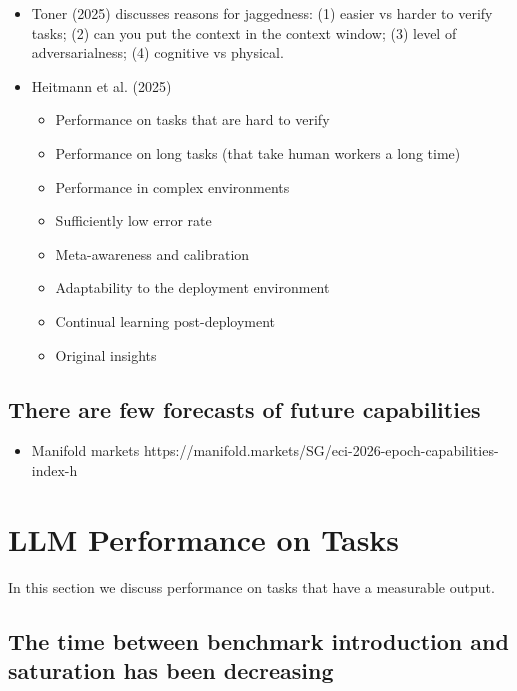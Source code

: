 \documentclass[
  letterpaper,
  DIV=11,
  numbers=noendperiod,
  oneside]{scrartcl}
\providecommand{\tightlist}{%
  \setlength{\itemsep}{0pt}\setlength{\parskip}{0pt}}
\begin{document}
\begin{itemize}
\tightlist
\item
  Toner (2025) discusses reasons for jaggedness: (1) easier vs harder to
  verify tasks; (2) can you put the context in the context window; (3)
  level of adversarialness; (4) cognitive vs physical.
\item
  Heitmann et al. (2025)

  \begin{itemize}
  \tightlist
  \item
    Performance on tasks that are hard to verify
  \item
    Performance on long tasks (that take human workers a long time)
  \item
    Performance in complex environments
  \item
    Sufficiently low error rate
  \item
    Meta-awareness and calibration
  \item
    Adaptability to the deployment environment
  \item
    Continual learning post-deployment
  \item
    Original insights
  \end{itemize}
\end{itemize}

\subsection{There are few forecasts of future
capabilities}\label{there-are-few-forecasts-of-future-capabilities}

\begin{itemize}
\tightlist
\item
  Manifold markets
  https://manifold.markets/SG/eci-2026-epoch-capabilities-index-h
\end{itemize}

\section{LLM Performance on Tasks}\label{llm-performance-on-tasks}

In this section we discuss performance on tasks that have a measurable
output.

\subsection{The time between benchmark introduction and saturation has
been
decreasing}\label{the-time-between-benchmark-introduction-and-saturation-has-been-decreasing}
\end{document}
